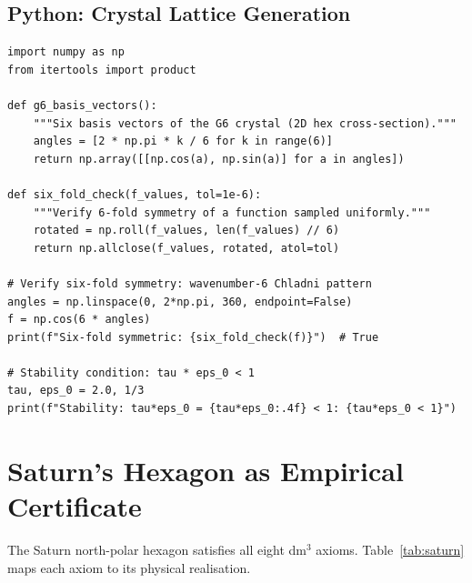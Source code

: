 \documentclass[11pt, a4paper]{article}
\theoremstyle{definition}
\begin{document}
\subsection{Python: Crystal Lattice Generation}

\begin{lstlisting}[language=Python3, caption={G6 crystal construction and six-fold symmetry check}, label={lst:crystal}]
import numpy as np
from itertools import product

def g6_basis_vectors():
    """Six basis vectors of the G6 crystal (2D hex cross-section)."""
    angles = [2 * np.pi * k / 6 for k in range(6)]
    return np.array([[np.cos(a), np.sin(a)] for a in angles])

def six_fold_check(f_values, tol=1e-6):
    """Verify 6-fold symmetry of a function sampled uniformly."""
    rotated = np.roll(f_values, len(f_values) // 6)
    return np.allclose(f_values, rotated, atol=tol)

# Verify six-fold symmetry: wavenumber-6 Chladni pattern
angles = np.linspace(0, 2*np.pi, 360, endpoint=False)
f = np.cos(6 * angles)
print(f"Six-fold symmetric: {six_fold_check(f)}")  # True

# Stability condition: tau * eps_0 < 1
tau, eps_0 = 2.0, 1/3
print(f"Stability: tau*eps_0 = {tau*eps_0:.4f} < 1: {tau*eps_0 < 1}")
\end{lstlisting}

\section{Saturn's Hexagon as Empirical Certificate}
\label{sec:saturn}

The Saturn north-polar hexagon satisfies all eight dm$^3$ axioms.
Table~\ref{tab:saturn} maps each axiom to its physical realisation.
\end{document}
